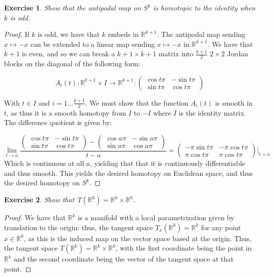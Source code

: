 \documentclass{article}
\newtheorem{exercise}{Exercise}
\begin{document}
        \begin{exercise}
          Show that the antipodal map on $S^{k}$ is homotopic to the identity when $k$ is odd.
        \end{exercise}
        \begin{proof}
          If $k$ is odd, we have that $k$ embeds in $\mathbb{R}^{k+1}$. The antipodal map sending $x \mapsto -x$ can be extended to a linear map sending $x \mapsto -x$ in $\mathbb{R}^{k+1}$. We have that $k+1$ is even, and so we can break a $k+1 \times k+1$ matrix into $\frac{k+1}{2}$ $2 \times 2$ Jordan blocks on the diagonal of the following form:

          \[
            A_{i}(t): \mathbb{R}^{k+1} \times I \to \mathbb{R}^{k+1}: \begin{pmatrix} \cos t \pi & -\sin t \pi \\ \sin t \pi & \cos t \pi \end{pmatrix}
          \]

          With $t \in I$ and $i = 1 ... \frac{k+1}{2}$. We must show that the function $A_{i}(t)$ is smooth in $t$, as thus it is a smooth homotopy from $I$ to $-I$ where $I$ is the identity matrix. The difference quotient is given by:

          \[
            \lim_{t \to a} \frac{\begin{pmatrix} \cos t \pi & -\sin t \pi \\ \sin t \pi & \cos t \pi \end{pmatrix} - \begin{pmatrix} \cos a \pi & -\sin a \pi \\ \sin a \pi & \cos a \pi \end{pmatrix}}{t-a} = \begin{pmatrix} - \pi \sin t \pi & - \pi \cos t \pi \\ \pi \cos t \pi & \pi \cos t \pi \end{pmatrix} \Bigg|_{t=a}
            \]
Which is continuous at all $a$, yielding that that it is continuously differentiable and thus smooth. This yields the desired homotopy on Euclidean space, and thus the desired homotopy on $S^{k}$.
          \end{proof}


          \begin{exercise}
            Show that T$(\mathbb{R}^{k}) = \mathbb{R}^{k} \times \mathbb{R}^{k} $.
          \end{exercise}

          \begin{proof}
            We have that $\mathbb{R}^{k}$ is a manifold with a local parametrization given by translation to the origin: thus, the tangent space $T_{x}(\mathbb{R}^{k}) = \mathbb{R}^{k}$ for any point $x \in \mathbb{R}^{k}$, as this is the induced map on the vector space based at the origin. Thus, the tangent space $T(\mathbb{R}^{k}) = \mathbb{R}^{k} \times \mathbb{R}^{k}$, with the first coordinate being the point in $\mathbb{R}^{k}$ and the second coordinate being the vector of the tangent space at that point. 
            \end{proof}
            \pagebreak
            
\end{document}
